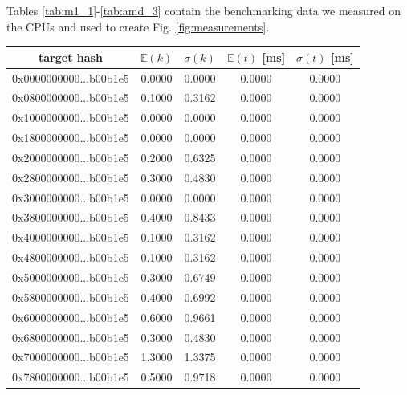 \documentclass[12pt, a4paper]{article}
\begin{document}
Tables \ref{tab:m1_1}-\ref{tab:amd_3} contain the benchmarking data we measured on the CPUs and used to create Fig. \ref{fig:measurements}.

\begin{table}[H]
    \centering
    \begin{tabular}{|c|c|c|c|c|} \hline
    target hash  & $\mathbb{E}(k)$ & $\sigma(k) $ & $\mathbb{E}(t)$ [ms] & $\sigma(t)$ [ms] \\ \hline
    0x0000000000...b00b1e5 &        0.0000 &        0.0000 &         0.0000 &        0.0000 \\ \hline
0x0800000000...b00b1e5 &        0.1000 &        0.3162 &         0.0000 &        0.0000 \\ \hline
0x1000000000...b00b1e5 &        0.0000 &        0.0000 &         0.0000 &        0.0000 \\ \hline
0x1800000000...b00b1e5 &        0.0000 &        0.0000 &         0.0000 &        0.0000 \\ \hline
0x2000000000...b00b1e5 &        0.2000 &        0.6325 &         0.0000 &        0.0000 \\ \hline
0x2800000000...b00b1e5 &        0.3000 &        0.4830 &         0.0000 &        0.0000 \\ \hline
0x3000000000...b00b1e5 &        0.0000 &        0.0000 &         0.0000 &        0.0000 \\ \hline
0x3800000000...b00b1e5 &        0.4000 &        0.8433 &         0.0000 &        0.0000 \\ \hline
0x4000000000...b00b1e5 &        0.1000 &        0.3162 &         0.0000 &        0.0000 \\ \hline
0x4800000000...b00b1e5 &        0.1000 &        0.3162 &         0.0000 &        0.0000 \\ \hline
0x5000000000...b00b1e5 &        0.3000 &        0.6749 &         0.0000 &        0.0000 \\ \hline
0x5800000000...b00b1e5 &        0.4000 &        0.6992 &         0.0000 &        0.0000 \\ \hline
0x6000000000...b00b1e5 &        0.6000 &        0.9661 &         0.0000 &        0.0000 \\ \hline
0x6800000000...b00b1e5 &        0.3000 &        0.4830 &         0.0000 &        0.0000 \\ \hline
0x7000000000...b00b1e5 &        1.3000 &        1.3375 &         0.0000 &        0.0000 \\ \hline
0x7800000000...b00b1e5 &        0.5000 &        0.9718 &         0.0000 &        0.0000 \\ \hline

\end{tabular}
\end{table}
\end{document}
